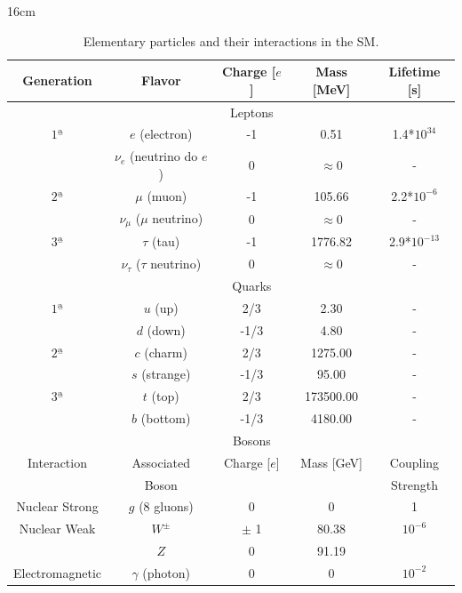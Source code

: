 \begin{table}[htbp]{16cm}
\caption{Elementary particles and their interactions in the SM.}
\centering
\begin{tabular}{ccccc}
\hline \hline
Generation & Flavor 							& Charge [$e$]  & Mass [MeV] 	& Lifetime [s]\\
\hline
		   &		 							& Leptons 	    &	   		   	& \\
\hline
$1ª$    & $e$ (electron) 					& -1  			& 0.51    		& 1.4*$10^{34}$ \\
		& $\nu_e$ (neutrino do $e$) 		& 0 			& $\approx 0$ 	& - \\
$2ª$	& $\mu$ (muon)  					& -1  			& 105.66  		& 2.2*$10^{-6}$ \\
		& $\nu_{\mu}$ ($\mu$ neutrino) 	    & 0 			& $\approx 0$ 	& - \\
$3ª$	& $\tau$ (tau) 						& -1  			& 1776.82 		& 2.9*$10^{-13}$ \\
		& $\nu_{\tau}$ ($\tau$ neutrino)    & 0 			& $\approx 0$ 	& - \\
\hline
		&		        & Quarks  	 &	   		   & \\
\hline
$1ª$	& $u$ (up)      & 2/3   & 2.30  	& - \\
		& $d$ (down)    & -1/3  & 4.80  	& - \\
$2ª$	& $c$ (charm)   & 2/3	& 1275.00 	& - \\
		& $s$ (strange) & -1/3  & 95.00   	& - \\
$3ª$	& $t$ (top)		& 2/3	& 173500.00 & - \\
		& $b$ (bottom)  & -1/3  & 4180.00 	& - \\
\hline
		        &		 		   & Bosons  	&	   		 & \\
\hline
Interaction 	& Associated   & Charge [$e$] & Mass [GeV] & Coupling\\
				& Boson		   &			&			   & Strength\\
\hline
Nuclear Strong  & $g$ (8 gluons)   & 0       	& 0     	 & 1\\
Nuclear Weak    & $W^{\pm}$		   & $\pm$ 1 	& 80.38 	 & $10^{-6}$\\
				& $Z$  		   	   & 0		 	& 91.19 	 &\\
Electromagnetic & $\gamma$ (photon) & 0 		 	& 0     	 & $10^{-2}$\\
\hline \hline
\end{tabular}\hfill
{}
\label{tab:TabParticulas}
\end{table}

